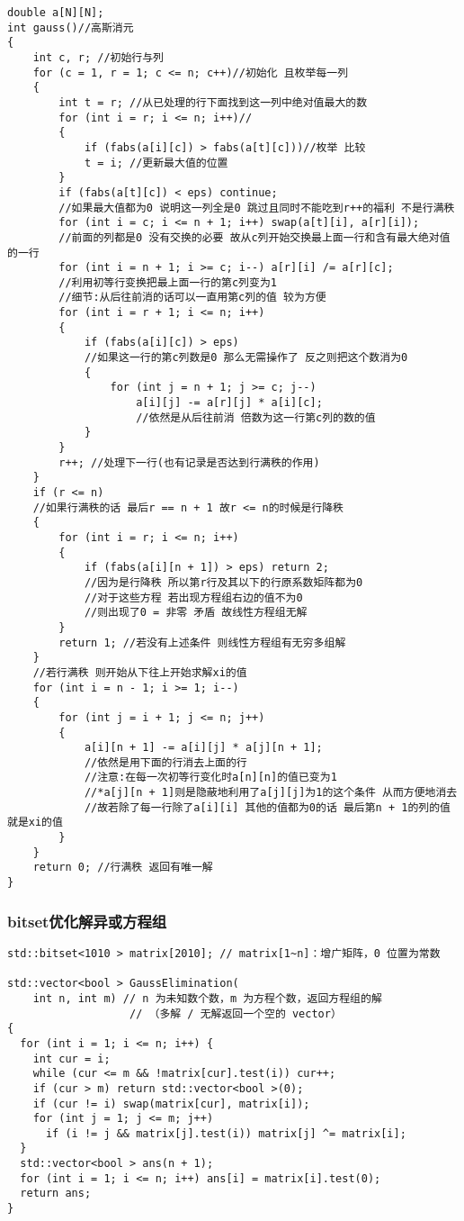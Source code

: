 \documentclass[a4paper, fontset=none]{ctexart}
\begin{document}
\begin{verbatim}
double a[N][N];
int gauss()//高斯消元
{
    int c, r; //初始行与列
    for (c = 1, r = 1; c <= n; c++)//初始化 且枚举每一列
    {
        int t = r; //从已处理的行下面找到这一列中绝对值最大的数
        for (int i = r; i <= n; i++)//
        {
            if (fabs(a[i][c]) > fabs(a[t][c]))//枚举 比较
            t = i; //更新最大值的位置
        }
        if (fabs(a[t][c]) < eps) continue;
        //如果最大值都为0 说明这一列全是0 跳过且同时不能吃到r++的福利 不是行满秩
        for (int i = c; i <= n + 1; i++) swap(a[t][i], a[r][i]);
        //前面的列都是0 没有交换的必要 故从c列开始交换最上面一行和含有最大绝对值的一行
        for (int i = n + 1; i >= c; i--) a[r][i] /= a[r][c];
        //利用初等行变换把最上面一行的第c列变为1
        //细节:从后往前消的话可以一直用第c列的值 较为方便
        for (int i = r + 1; i <= n; i++)
        {
            if (fabs(a[i][c]) > eps)
            //如果这一行的第c列数是0 那么无需操作了 反之则把这个数消为0
            {
                for (int j = n + 1; j >= c; j--)
                    a[i][j] -= a[r][j] * a[i][c];
                    //依然是从后往前消 倍数为这一行第c列的数的值
            }
        }
        r++; //处理下一行(也有记录是否达到行满秩的作用)
    }
    if (r <= n)
    //如果行满秩的话 最后r == n + 1 故r <= n的时候是行降秩
    {
        for (int i = r; i <= n; i++)
        {
            if (fabs(a[i][n + 1]) > eps) return 2;
            //因为是行降秩 所以第r行及其以下的行原系数矩阵都为0
            //对于这些方程 若出现方程组右边的值不为0
            //则出现了0 = 非零 矛盾 故线性方程组无解
        }
        return 1; //若没有上述条件 则线性方程组有无穷多组解
    }
    //若行满秩 则开始从下往上开始求解xi的值
    for (int i = n - 1; i >= 1; i--)
    {
        for (int j = i + 1; j <= n; j++)
        {
            a[i][n + 1] -= a[i][j] * a[j][n + 1];
            //依然是用下面的行消去上面的行
            //注意:在每一次初等行变化时a[n][n]的值已变为1
            //*a[j][n + 1]则是隐蔽地利用了a[j][j]为1的这个条件 从而方便地消去
            //故若除了每一行除了a[i][i] 其他的值都为0的话 最后第n + 1的列的值就是xi的值
        }
    }
    return 0; //行满秩 返回有唯一解
}
\end{verbatim}
\subsubsection{bitset优化解异或方程组}

\begin{verbatim}
std::bitset<1010 > matrix[2010]; // matrix[1~n]：增广矩阵，0 位置为常数

std::vector<bool > GaussElimination(
    int n, int m) // n 为未知数个数，m 为方程个数，返回方程组的解
                   // （多解 / 无解返回一个空的 vector）
{
  for (int i = 1; i <= n; i++) {
    int cur = i;
    while (cur <= m && !matrix[cur].test(i)) cur++;
    if (cur > m) return std::vector<bool >(0);
    if (cur != i) swap(matrix[cur], matrix[i]);
    for (int j = 1; j <= m; j++)
      if (i != j && matrix[j].test(i)) matrix[j] ^= matrix[i];
  }
  std::vector<bool > ans(n + 1);
  for (int i = 1; i <= n; i++) ans[i] = matrix[i].test(0);
  return ans;
}
\end{verbatim}
\end{document}
